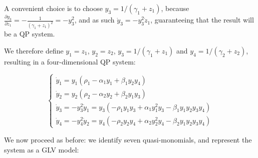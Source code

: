 \documentclass{article}
\begin{document}
A convenient choice is to choose \(y_3 = 1 / (\gamma_1 + z_1)\), because
\(\frac{\partial y_3}{\partial z_1} = - \frac{1}{(\gamma_1 + z_1)^2} = -y_3^2\),
and as such \(\dot{y}_3 = -y_3^2 \dot{z}_1\), guaranteeing that the
result will be a QP system.

We therefore define \(y_1 = z_1\), \(y_2 = z_2\),
\(y_3 = 1/(\gamma_1 + z_1)\) and \(y_4 = 1 / (\gamma_2 + z_2)\),
resulting in a four-dimensional QP system:

\begin{equation}
\begin{cases}
\dot{y}_1 = y_1 \left(\rho_1 - \alpha_1 y_1 + \beta_1 y_2 y_4 \right)\\
\dot{y}_2 = y_2 \left(\rho_2 - \alpha_2 y_2 + \beta_2 y_1 y_3 \right)\\
\dot{y}_3 = -y_3^2 \dot{y}_1 = y_3 (-\rho_1 y_1 y_3 + \alpha_1 y_1^2 y_3 - \beta_1 y_1 y_2 y_3 y_4)\\
\dot{y}_4 = -y_4^2 \dot{y}_2 = y_4 (-\rho_2 y_2 y_4 + \alpha_2 y_2^2 y_4 - \beta_2 y_1 y_2 y_3 y_4)
\end{cases}
\end{equation}

We now proceed as before: we identify seven quasi-monomials, and
represent the system as a GLV model:
\end{document}
